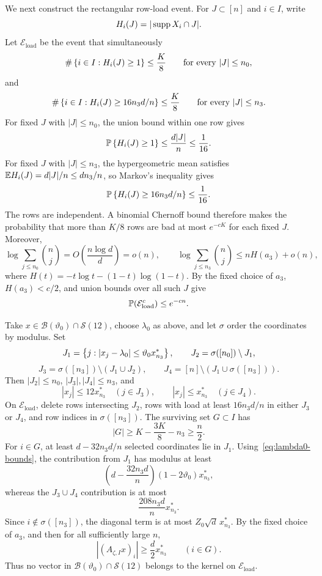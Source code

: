 We next construct the rectangular row-load event. For $J\subset[n]$ and $i\in I$, write
\[
  H_i(J)=|\operatorname{supp} X_i\cap J|.
\]
Let $\mathcal E_{\mathrm{load}}$ be the event that simultaneously
\begin{equation}\label{eq:load-small-J}
  \#\left\{i\in I:H_i(J)\ge1\right\}\le\frac K8
  \qquad\text{for every }|J|\le n_0,
\end{equation}
and
\begin{equation}\label{eq:load-n3-J}
  \#\left\{i\in I:H_i(J)\ge16n_3d/n\right\}\le\frac K8
  \qquad\text{for every }|J|\le n_3.
\end{equation}
For fixed $J$ with $|J|\le n_0$, the union bound within one row gives
\[
  \mathbb P\left\{H_i(J)\ge1\right\}\le\frac{d|J|}{n}\le\frac1{16}.
\]
For fixed $J$ with $|J|\le n_3$, the hypergeometric mean satisfies $\mathbb E H_i(J)=d|J|/n\le dn_3/n$, so Markov's inequality gives
\[
  \mathbb P\left\{H_i(J)\ge16n_3d/n\right\}\le\frac1{16}.
\]
The rows are independent. A binomial Chernoff bound therefore makes the probability that more than $K/8$ rows are bad at most $e^{-cK}$ for each fixed $J$. Moreover,
\[
  \log\sum_{j\le n_0}\binom nj
  =O\left(\frac{n\log d}{d}\right)=o(n),
  \qquad
  \log\sum_{j\le n_3}\binom nj
  \le nH(a_3)+o(n),
\]
where $H(t)=-t\log t-(1-t)\log(1-t)$. By the fixed choice of $a_3$, $H(a_3)<c/2$, and union bounds over all such $J$ give
\begin{equation}\label{eq:load-failure}
  \mathbb P(\mathcal E_{\mathrm{load}}^c)\le e^{-cn}.
\end{equation}

Take $x\in\mathcal B(\vartheta_0)\cap\mathcal S(12)$, choose $\lambda_0$ as above, and let $\sigma$ order the coordinates by modulus. Set
\[
  J_1=\left\{j:|x_j-\lambda_0|\le\vartheta_0x_{n_3}^*\right\},
  \qquad
  J_2=\sigma([n_0])\setminus J_1,
\]
\[
  J_3=\sigma([n_3])\setminus(J_1\cup J_2),
  \qquad
  J_4=[n]\setminus(J_1\cup\sigma([n_3])).
\]
Then $|J_2|\le n_0$, $|J_3|,|J_4|\le n_3$, and
\[
  |x_j|\le12x_{n_3}^*\quad(j\in J_3),
  \qquad
  |x_j|\le x_{n_3}^*\quad(j\in J_4).
\]
On $\mathcal E_{\mathrm{load}}$, delete rows intersecting $J_2$, rows with load at least $16n_3d/n$ in either $J_3$ or $J_4$, and row indices in $\sigma([n_3])$. The surviving set $G\subset I$ has
\begin{equation}\label{eq:surviving-G}
  |G|\ge K-\frac{3K}{8}-n_3\ge\frac n2.
\end{equation}
For $i\in G$, at least $d-32n_3d/n$ selected coordinates lie in $J_1$. Using~\eqref{eq:lambda0-bounds}, the contribution from $J_1$ has modulus at least
\[
  \left(d-\frac{32n_3d}{n}\right)(1-2\vartheta_0)x_{n_3}^*,
\]
whereas the $J_3\cup J_4$ contribution is at most
\[
  \frac{208n_3d}{n}x_{n_3}^*.
\]
Since $i\notin\sigma([n_3])$, the diagonal term is at most $Z_0\sqrt d\,x_{n_3}^*$. By the fixed choice of $a_3$, and then for all sufficiently large $n$,
\begin{equation}\label{eq:almost-constant-row-lower}
  |(A_{\zeta,I}x)_i|\ge\frac d2x_{n_3}^*
  \qquad(i\in G).
\end{equation}
Thus no vector in $\mathcal B(\vartheta_0)\cap\mathcal S(12)$ belongs to the kernel on $\mathcal E_{\mathrm{load}}$.

